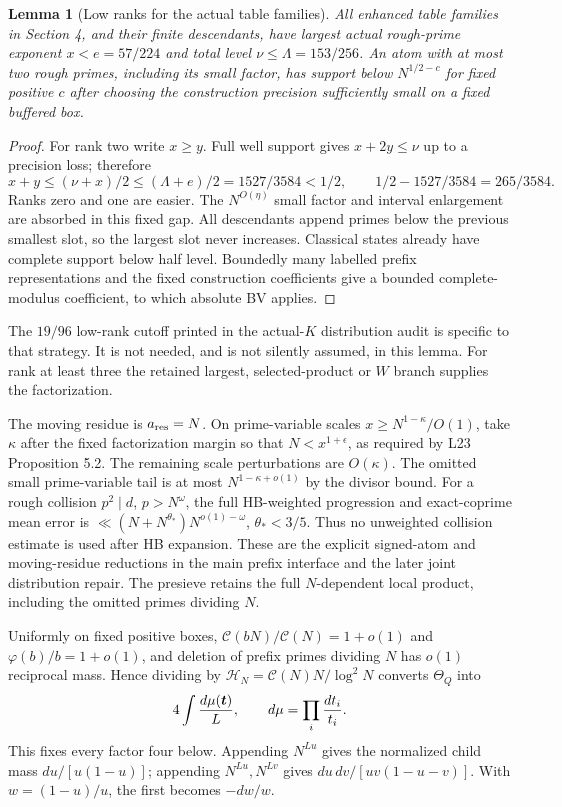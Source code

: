 \documentclass[11pt]{article}
\newtheorem{lemma}{Lemma}
\newcommand{\CN}{\mathcal C(N)}
\begin{document}
\begin{lemma}[Low ranks for the actual table families]\label{lem:lowrank}
All enhanced table families in Section 4, and their finite descendants,
have largest actual rough-prime exponent $x<e=57/224$ and total level
$\nu\le\Lambda=153/256$. An atom with at most two rough primes,
including its small factor, has support below $N^{1/2-c}$ for fixed
positive $c$ after choosing the construction precision sufficiently
small on a fixed buffered box.
\end{lemma}
\begin{proof}
For rank two write $x\ge y$. Full well support gives $x+2y\le\nu$
up to a precision loss; therefore
\[
 x+y\le(\nu+x)/2\le(\Lambda+e)/2
 =1527/3584<1/2,\qquad
 1/2-1527/3584=265/3584.
\]
Ranks zero and one are easier. The $N^{O(\eta)}$ small factor and
interval enlargement are absorbed in this fixed gap. All descendants
append primes below the previous smallest slot, so the largest slot
never increases. Classical states already have complete support below
half level. Boundedly many labelled prefix representations and the
fixed construction coefficients give a bounded complete-modulus
coefficient, to which absolute BV applies.
\end{proof}
The $19/96$ low-rank cutoff printed in the actual-$K$ distribution
audit is specific to that strategy. It is not needed, and is not
silently assumed, in this lemma. For rank at least three the retained
largest, selected-product or $W$ branch supplies the factorization.

The moving residue is $a_{\rm res}=N$. On prime-variable scales
$x\ge N^{1-\kappa}/O(1)$, take $\kappa$ after the fixed factorization
margin so that $N<x^{1+\epsilon}$, as required by L23 Proposition 5.2.
The remaining scale perturbations are $O(\kappa)$. The omitted small
prime-variable tail is at most $N^{1-\kappa+o(1)}$ by the divisor
bound. For a rough collision $p^2\mid d$, $p>N^\omega$, the full
HB-weighted progression and exact-coprime mean error is
$\ll(N+N^{\theta_*})N^{o(1)-\omega}$, $\theta_*<3/5$.
Thus no unweighted collision estimate is used after HB expansion.
These are the explicit signed-atom and moving-residue reductions in
the main prefix interface and the later joint distribution repair.
The presieve retains the full $N$-dependent local product, including
the omitted primes dividing $N$.

Uniformly on fixed positive boxes,
$\mathcal C(bN)/\mathcal C(N)=1+o(1)$ and
$\varphi(b)/b=1+o(1)$, and deletion of prefix primes dividing $N$
has $o(1)$ reciprocal mass. Hence dividing by
$\mathcal H_N=\CN N/\log^2N$ converts $\Theta_Q$ into
\begin{equation}\label{eq:norm}
             4\int {d\mu(\boldsymbol t)\over L},
 \qquad d\mu=\prod_i{dt_i\over t_i}.
\end{equation}
This fixes every factor four below. Appending $N^{Lu}$ gives the
normalized child mass $du/[u(1-u)]$; appending $N^{Lu},N^{Lv}$ gives
$du\,dv/[uv(1-u-v)]$. With $w=(1-u)/u$, the first becomes $-dw/w$.
\end{document}
